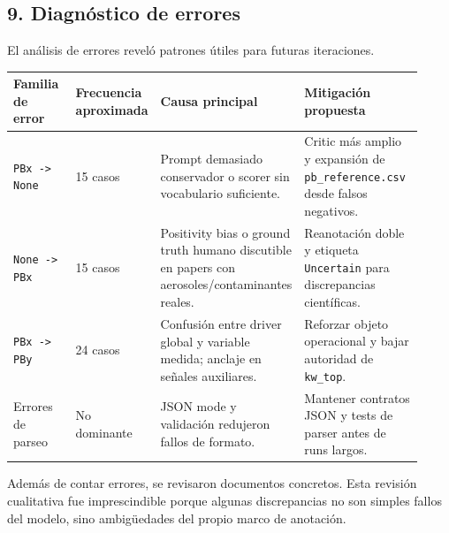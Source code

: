 \subsection{9. Diagnóstico de errores}

El análisis de errores reveló patrones útiles para futuras iteraciones.


\begin{center}
\scriptsize
\setlength{\tabcolsep}{4pt}
\renewcommand{\arraystretch}{1.18}
\begin{tabular}{p{0.18\linewidth}p{0.17\linewidth}p{0.25\linewidth}p{0.32\linewidth}}
\toprule
Familia de error & Frecuencia aproximada & Causa principal & Mitigación propuesta \\
\midrule
\texttt{PBx -> None} & 15 casos & Prompt demasiado conservador o scorer sin vocabulario suficiente. & Critic más amplio y expansión de \texttt{pb\_reference.csv} desde falsos negativos. \\
\texttt{None -> PBx} & 15 casos & Positivity bias o ground truth humano discutible en papers con aerosoles/contaminantes reales. & Reanotación doble y etiqueta \texttt{Uncertain} para discrepancias científicas. \\
\texttt{PBx -> PBy} & 24 casos & Confusión entre driver global y variable medida; anclaje en señales auxiliares. & Reforzar objeto operacional y bajar autoridad de \texttt{kw\_top}. \\
Errores de parseo & No dominante & JSON mode y validación redujeron fallos de formato. & Mantener contratos JSON y tests de parser antes de runs largos. \\
\bottomrule
\end{tabular}
\end{center}


Además de contar errores, se revisaron documentos concretos. Esta revisión cualitativa fue imprescindible porque algunas discrepancias no son simples fallos del modelo, sino ambigüedades del propio marco de anotación.

